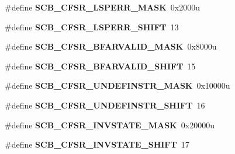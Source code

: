 \begin{DoxyCompactItemize}
\item 
\hypertarget{group___s_c_b___register___masks_gadc9fdd5ad5b81573e212f4fb2b7037a8}{}\#define {\bfseries S\+C\+B\+\_\+\+C\+F\+S\+R\+\_\+\+L\+S\+P\+E\+R\+R\+\_\+\+M\+A\+S\+K}~0x2000u\label{group___s_c_b___register___masks_gadc9fdd5ad5b81573e212f4fb2b7037a8}

\item 
\hypertarget{group___s_c_b___register___masks_gaec9c6863838ea41fab52e4122768c0b4}{}\#define {\bfseries S\+C\+B\+\_\+\+C\+F\+S\+R\+\_\+\+L\+S\+P\+E\+R\+R\+\_\+\+S\+H\+I\+F\+T}~13\label{group___s_c_b___register___masks_gaec9c6863838ea41fab52e4122768c0b4}

\item 
\hypertarget{group___s_c_b___register___masks_ga2c31bcec0ebfe102b18ae14118d75195}{}\#define {\bfseries S\+C\+B\+\_\+\+C\+F\+S\+R\+\_\+\+B\+F\+A\+R\+V\+A\+L\+I\+D\+\_\+\+M\+A\+S\+K}~0x8000u\label{group___s_c_b___register___masks_ga2c31bcec0ebfe102b18ae14118d75195}

\item 
\hypertarget{group___s_c_b___register___masks_gad0766c4238379fdd83302e426e9e6025}{}\#define {\bfseries S\+C\+B\+\_\+\+C\+F\+S\+R\+\_\+\+B\+F\+A\+R\+V\+A\+L\+I\+D\+\_\+\+S\+H\+I\+F\+T}~15\label{group___s_c_b___register___masks_gad0766c4238379fdd83302e426e9e6025}

\item 
\hypertarget{group___s_c_b___register___masks_ga8ded3691908c76b3b63881a9fa2210a6}{}\#define {\bfseries S\+C\+B\+\_\+\+C\+F\+S\+R\+\_\+\+U\+N\+D\+E\+F\+I\+N\+S\+T\+R\+\_\+\+M\+A\+S\+K}~0x10000u\label{group___s_c_b___register___masks_ga8ded3691908c76b3b63881a9fa2210a6}

\item 
\hypertarget{group___s_c_b___register___masks_ga6c866b78525432c99382e65b1c32a19e}{}\#define {\bfseries S\+C\+B\+\_\+\+C\+F\+S\+R\+\_\+\+U\+N\+D\+E\+F\+I\+N\+S\+T\+R\+\_\+\+S\+H\+I\+F\+T}~16\label{group___s_c_b___register___masks_ga6c866b78525432c99382e65b1c32a19e}

\item 
\hypertarget{group___s_c_b___register___masks_ga3f332ed2c6b495efc516578c37ab6e59}{}\#define {\bfseries S\+C\+B\+\_\+\+C\+F\+S\+R\+\_\+\+I\+N\+V\+S\+T\+A\+T\+E\+\_\+\+M\+A\+S\+K}~0x20000u\label{group___s_c_b___register___masks_ga3f332ed2c6b495efc516578c37ab6e59}

\item 
\hypertarget{group___s_c_b___register___masks_ga8951e7b3d18c32e84d100b594c4533df}{}\#define {\bfseries S\+C\+B\+\_\+\+C\+F\+S\+R\+\_\+\+I\+N\+V\+S\+T\+A\+T\+E\+\_\+\+S\+H\+I\+F\+T}~17\label{group___s_c_b___register___masks_ga8951e7b3d18c32e84d100b594c4533df}


\end{DoxyCompactItemize}
